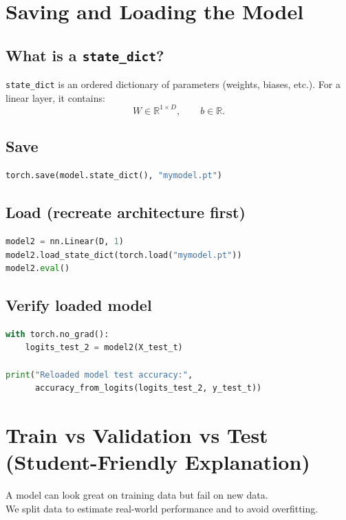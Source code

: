 \section{Saving and Loading the Model}

\subsection{What is a \texttt{state\_dict}?}
\texttt{state\_dict} is an ordered dictionary of parameters (weights, biases, etc.).
For a linear layer, it contains:
\[
W \in \mathbb{R}^{1\times D},\qquad b \in \mathbb{R}.
\]

\subsection{Save}
\begin{lstlisting}[language=Python,caption={Save learned parameters}]
torch.save(model.state_dict(), "mymodel.pt")
\end{lstlisting}

\subsection{Load (recreate architecture first)}
\begin{lstlisting}[language=Python,caption={Load parameters into a new model with same architecture}]
model2 = nn.Linear(D, 1)
model2.load_state_dict(torch.load("mymodel.pt"))
model2.eval()
\end{lstlisting}

\subsection{Verify loaded model}
\begin{lstlisting}[language=Python,caption={Check test accuracy of loaded model}]
with torch.no_grad():
    logits_test_2 = model2(X_test_t)

print("Reloaded model test accuracy:",
      accuracy_from_logits(logits_test_2, y_test_t))
\end{lstlisting}

\section{Train vs Validation vs Test (Student-Friendly Explanation)}

\begin{tcolorbox}[colframe=blue!60!black,colback=blue!3,title=\textbf{\color{blue!70!black}Why splitting matters}]
A model can look great on training data but fail on new data. \\
We split data to estimate real-world performance and to avoid overfitting.
\end{tcolorbox}

